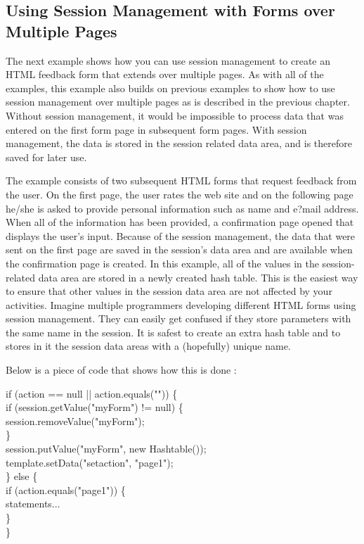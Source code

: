\subsection{Using Session Management with Forms over Multiple Pages}
The next example shows how you can use session management to create an
HTML feedback form that extends over multiple pages. As with all of the
examples, this example also builds on previous examples to show how to
use session management over multiple pages as is described in the
previous chapter. Without session management, it would be impossible to
process data that was entered on the first form page in subsequent form
pages. With session management, the data is stored in the session
related data area, and is therefore saved for later use.

The example consists of two subsequent HTML forms that request feedback
from the user. On the first page, the user rates the web site and on the
following page he/she is asked to provide personal information such as
name and e?mail address. When all of the information has been provided,
a confirmation page opened that displays the user's input. Because of
the session management, the data that were sent on the first page are
saved in the session's data area and are available when the confirmation
page is created.
In this example, all of the values in the session-related data area are
stored in a newly created hash table. This is the easiest way to ensure
that other values in the session data area are not affected by your
activities. Imagine multiple programmers developing different HTML forms
using session management. They can easily get confused if they store
parameters with the same name in the session. It is safest to create an
extra hash table and to stores in it the session data areas with a
(hopefully) unique name.

Below is a piece of code that shows how this is done :

\begin{java}
if (action == null || action.equals("")) \{\\
\jtaba    if (session.getValue("myForm") != null) \{\\
\jtabb        session.removeValue("myForm");\\
\jtaba    \}\\
\jtaba    session.putValue("myForm", new Hashtable());\\
\jtaba    template.setData("setaction", "page1");\\
\} else \{\\
\jtaba    if (action.equals("page1")) \{\\
\jtabb        statements...\\
\jtaba    \}\\
\}\\
\end{java}

